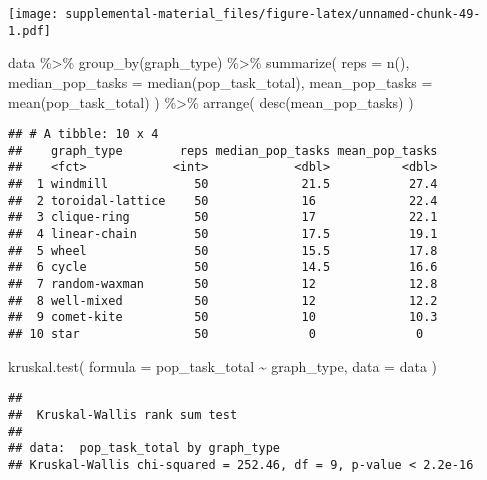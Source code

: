 \documentclass[
]{book}
\newenvironment{Shaded}{\begin{snugshade}}{\end{snugshade}}
\newcommand{\AttributeTok}[1]{\textcolor[rgb]{0.77,0.63,0.00}{#1}}
\newcommand{\FunctionTok}[1]{\textcolor[rgb]{0.00,0.00,0.00}{#1}}
\newcommand{\NormalTok}[1]{#1}
\newcommand{\SpecialCharTok}[1]{\textcolor[rgb]{0.00,0.00,0.00}{#1}}
\begin{document}
\texttt{[image: supplemental-material\_files/figure-latex/unnamed-chunk-49-1.pdf]}

\begin{Shaded}
\begin{Highlighting}[]
\NormalTok{data }\SpecialCharTok{\%\textgreater{}\%}
  \FunctionTok{group\_by}\NormalTok{(graph\_type) }\SpecialCharTok{\%\textgreater{}\%}
  \FunctionTok{summarize}\NormalTok{(}
    \AttributeTok{reps =} \FunctionTok{n}\NormalTok{(),}
    \AttributeTok{median\_pop\_tasks =} \FunctionTok{median}\NormalTok{(pop\_task\_total),}
    \AttributeTok{mean\_pop\_tasks =} \FunctionTok{mean}\NormalTok{(pop\_task\_total)}
\NormalTok{  ) }\SpecialCharTok{\%\textgreater{}\%}
  \FunctionTok{arrange}\NormalTok{(}
    \FunctionTok{desc}\NormalTok{(mean\_pop\_tasks)}
\NormalTok{  )}
\end{Highlighting}
\end{Shaded}

\begin{verbatim}
## # A tibble: 10 x 4
##    graph_type        reps median_pop_tasks mean_pop_tasks
##    <fct>            <int>            <dbl>          <dbl>
##  1 windmill            50             21.5           27.4
##  2 toroidal-lattice    50             16             22.4
##  3 clique-ring         50             17             22.1
##  4 linear-chain        50             17.5           19.1
##  5 wheel               50             15.5           17.8
##  6 cycle               50             14.5           16.6
##  7 random-waxman       50             12             12.8
##  8 well-mixed          50             12             12.2
##  9 comet-kite          50             10             10.3
## 10 star                50              0              0
\end{verbatim}

\begin{Shaded}
\begin{Highlighting}[]
\FunctionTok{kruskal.test}\NormalTok{(}
  \AttributeTok{formula =}\NormalTok{ pop\_task\_total }\SpecialCharTok{\textasciitilde{}}\NormalTok{ graph\_type,}
  \AttributeTok{data =}\NormalTok{ data}
\NormalTok{)}
\end{Highlighting}
\end{Shaded}

\begin{verbatim}
## 
##  Kruskal-Wallis rank sum test
## 
## data:  pop_task_total by graph_type
## Kruskal-Wallis chi-squared = 252.46, df = 9, p-value < 2.2e-16
\end{verbatim}
\end{document}
